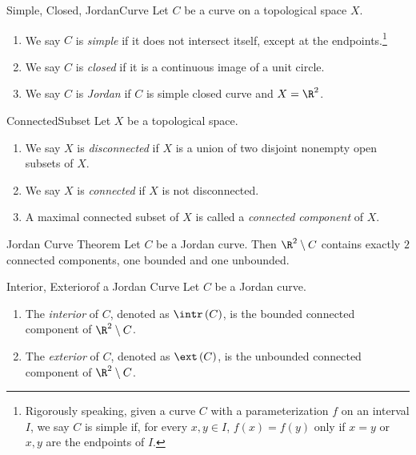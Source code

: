 \documentclass[co342]{subfiles}
\begin{document}
    \begin{recall}{Simple, Closed, Jordan}{Curve}
        Let $C$ be a curve on a topological space $X$.
        \begin{enumerate}
            \item We say $C$ is \emph{simple} if it does not intersect itself, except at the endpoints.\footnote{Rigorously speaking, given a curve $C$ with a parameterization $f$ on an interval $I$, we say $C$ is simple if, for every $x,y\in I$, $f\left( x \right)=f\left( y \right)$ only if $x=y$ or $x,y$ are the endpoints of $I$.}
            \item We say $C$ is \emph{closed} if it is a continuous image of a unit circle.
            \item We say $C$ is \emph{Jordan} if $C$ is simple closed curve and $X=\R^{2}$.
        \end{enumerate}
    \end{recall}

    \begin{recall}{Connected}{Subset}
        Let $X$ be a topological space.
        \begin{enumerate}
            \item We say $X$ is \emph{disconnected} if $X$ is a union of two disjoint nonempty open subsets of $X$.
            \item We say $X$ is \emph{connected} if $X$ is not disconnected.
            \item A maximal connected subset of $X$ is called a \emph{connected component} of $X$.
        \end{enumerate}
    \end{recall}

    \begin{theorem}{Jordan Curve Theorem}
        Let $C$ be a Jordan curve. Then $\R^{2}\setminus C$ contains exactly $2$ connected components, one bounded and one unbounded.
    \end{theorem}

    \begin{recall}{Interior, Exterior}{of a Jordan Curve}
        Let $C$ be a Jordan curve.
        \begin{enumerate}
            \item The \emph{interior} of $C$, denoted as $\intr\left( C \right)$, is the bounded connected component of $\R^{2}\setminus C$.
            \item The \emph{exterior} of $C$, denoted as $\ext\left( C \right)$, is the unbounded connected component of $\R^{2}\setminus C$.
        \end{enumerate}
    \end{recall}
\end{document}
